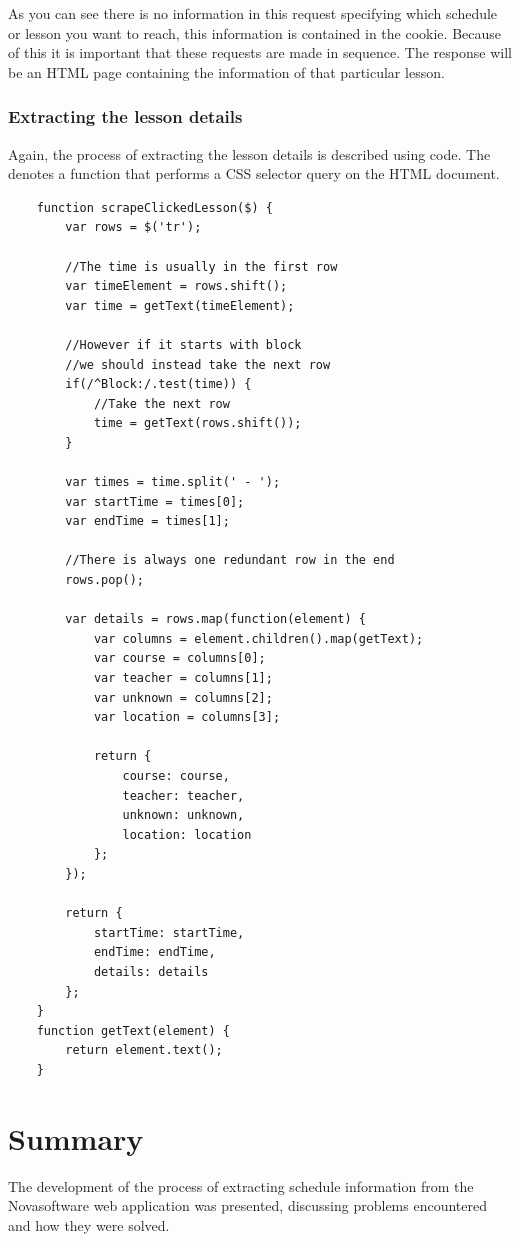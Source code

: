 \documentclass{article}
\begin{document}
	As you can see there is no information in this request specifying which schedule or lesson you want to reach, this information is contained in the cookie. Because of this it is important that these requests are made in sequence. The response will be an HTML page containing the information of that particular lesson.
	
	\subsubsection{Extracting the lesson details}
	
	Again, the process of extracting the lesson details is described using code. The \texttt{\textdollar} denotes a function that performs a CSS selector query on the HTML document.
	
	\medskip
	\begin{lstlisting}
	function scrapeClickedLesson($) {
		var rows = $('tr');
		
		//The time is usually in the first row
		var timeElement = rows.shift();
		var time = getText(timeElement);
		
		//However if it starts with block
		//we should instead take the next row
		if(/^Block:/.test(time)) {
			//Take the next row
			time = getText(rows.shift());
		}
		
		var times = time.split(' - ');
		var startTime = times[0];
		var endTime = times[1];
		
		//There is always one redundant row in the end
		rows.pop();
		
		var details = rows.map(function(element) {
			var columns = element.children().map(getText);
			var course = columns[0];
			var teacher = columns[1];
			var unknown = columns[2];
			var location = columns[3];
			
			return {
				course: course,
				teacher: teacher,
				unknown: unknown,
				location: location
			};
		});
		
		return {
			startTime: startTime,
			endTime: endTime,
			details: details
		};
	}
	function getText(element) {
		return element.text();
	}
	\end{lstlisting}
	
	\section{Summary}
	The development of the process of extracting schedule information from the Novasoftware web application was presented, discussing problems encountered and how they were solved.
	
\end{document}
